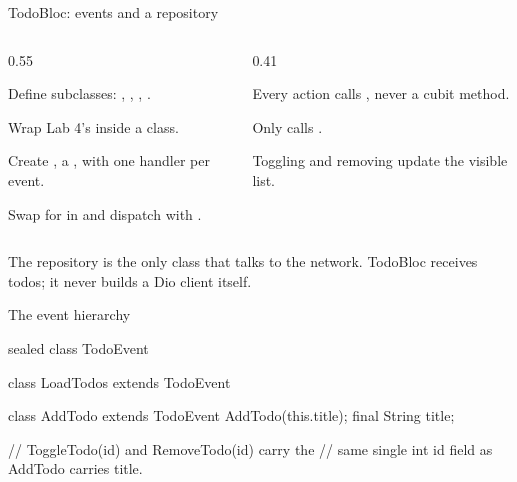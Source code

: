 \documentclass[10pt,aspectratio=169,t]{beamer}
\begin{document}
\begin{frame}[eyebrow=Task II]{TodoBloc: events and a repository}
  \begin{columns}[T]
    \begin{column}{0.55\textwidth}
      \begin{steps}
        \item Define  subclasses: , , , .
        \item Wrap Lab 4's  inside a  class.
        \item Create , a , with one  handler per event.
        \item Swap  for  in  and dispatch with .
      \end{steps}
    \end{column}
    \begin{column}{0.41\textwidth}
      \begin{checklist}
        \item Every action calls , never a cubit method.
        \item Only  calls .
        \item Toggling and removing update the visible list.
      \end{checklist}
    \end{column}
  \end{columns}
  \begin{takeaway}{The repository is the only class that talks to the network.}
    TodoBloc receives todos; it never builds a Dio client itself.
  \end{takeaway}
\end{frame}

\begin{frame}[fragile,eyebrow=Task II]{The event hierarchy}
\begin{dart}
sealed class TodoEvent {}

class LoadTodos extends TodoEvent {}

class AddTodo extends TodoEvent {
  AddTodo(this.title);
  final String title;
}

// ToggleTodo(id) and RemoveTodo(id) carry the
// same single int id field as AddTodo carries title.
\end{dart}
\end{frame}
\end{document}
